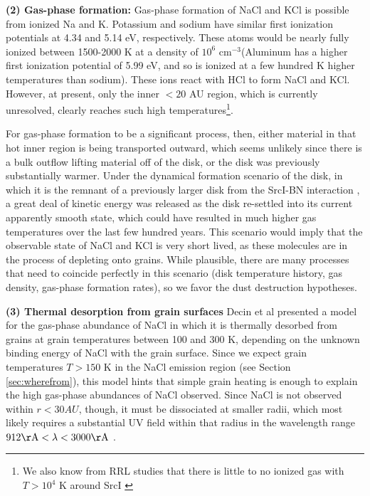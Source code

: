 \documentclass[12pt]{article}
\newcommand{\sourcei}{SrcI\xspace}
\newcommand{\percc}{\ensuremath{\textrm{cm}^{-3}}\xspace}
\begin{document}
\textbf{(2) Gas-phase formation:}
Gas-phase formation of NaCl and KCl is possible from ionized Na and K.
Potassium and sodium have similar first ionization potentials at 4.34 and 5.14
eV, respectively.  These atoms would be nearly fully ionized between 1500-2000
K at a density of $10^6$ \percc (Aluminum has a higher first ionization
potential of 5.99 eV, and so is ionized at a few hundred K higher temperatures
than sodium).  These ions react with HCl to form NaCl and KCl.  However, at
present, only the inner $<20$ AU region, which is currently unresolved, clearly
reaches such high temperatures\footnote{We also know from RRL studies that
there is little to no ionized gas with $T>10^4$ K around \sourcei
\cite{Plambeck2016a,Baez-Rubio2018a}}.  

For gas-phase formation to be a significant process, then, either material in
that hot inner region is being transported outward, which seems unlikely since
there is a bulk outflow lifting material off of the disk, or the disk was
previously substantially warmer.  Under the dynamical formation scenario of the
disk, in which it is the remnant of a previously larger disk from the
\sourcei-BN interaction \cite{Bally2017a,Luhman2017a}, a great deal of kinetic
energy was released as the disk re-settled into its current apparently smooth
state, which could have resulted in much higher gas temperatures over the last
few hundred years.  This scenario would imply that the observable state of NaCl
and KCl is very short lived, as these molecules are in the process of depleting
onto grains.  While plausible, there are many processes that need to coincide
perfectly in this scenario (disk temperature history, gas density, gas-phase
formation rates), so we favor the dust destruction hypotheses.

\textbf{(3) Thermal desorption from grain surfaces}
Decin et al \cite{Decin2016a} presented a model for the gas-phase abundance of
NaCl in which it is thermally desorbed from grains at grain temperatures
between 100 and 300 K, depending on the unknown binding energy of NaCl with
the grain surface.  Since we expect grain temperatures $T>150$ K in the
NaCl emission region (see Section \ref{sec:wherefrom}), this model hints
that simple grain heating is enough to explain the high gas-phase abundances
of NaCl observed.  Since NaCl is not observed within $r<30 AU$, though,
it must be dissociated at smaller radii, which most likely requires
a substantial UV field within that radius in the wavelength range
$912 \mathrm{\AA} < \lambda < 3000 \mathrm{\AA}$ \cite{Silver1986a}.
\end{document}
